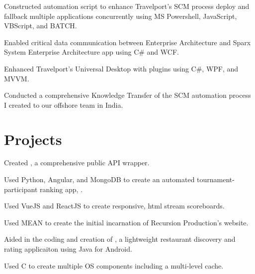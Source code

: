 \documentclass[]{deedy-resume-openfont}
\begin{document}
\begin{minipage}[t]{0.66\textwidth}
\begin{tightemize}
\item Constructed automation script to enhance Travelport's SCM process deploy and fallback multiple applications concurrently using MS Powershell, JavaScript, VBScript, and BATCH.
\item Enabled critical data communication between Enterprise Architecture and Sparx System Enterprise Architecture app using C\# and WCF.\item Enhanced Travelport's Universal Desktop with plugins using C\#, WPF, and MVVM.\item Conducted a comprehensive Knowledge Transfer of the SCM automation process I created to our offshore team in India.
\end{tightemize}
\sectionsep


\section{Projects}
\begin{tightemize} 
\item Created \href{http://npmjs.com/package/smashgg.js}{}, a comprehensive \href{www.smash.gg}{} public API wrapper. \item Used Python, Angular, and MongoDB to create an automated tournament-participant ranking app, \href{https://notgarpr.com}{}. \item Used VueJS and ReactJS to create responsive, html stream scoreboards. \item Used MEAN to create the initial incarnation of Recursion Production's website.
\end{tightemize}
\sectionsep

\begin{tightemize}
\item Aided in the coding and creation of \href{https://play.google.com/store/apps/details?id=com.gmail.japa.arialdis.tasteslikechickenlite&hl=en}{}, a lightweight restaurant discovery and rating applicaiton using Java for Android. \item Used C to create multiple OS components including a multi-level cache.
\end{tightemize}
\sectionsep





\end{minipage} 
\end{document}
